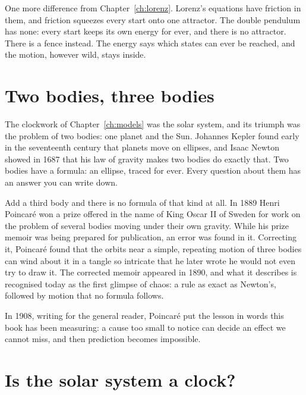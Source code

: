 \noindent
One more difference from Chapter~\ref{ch:lorenz}. Lorenz's equations have
friction in them, and friction squeezes every start onto one attractor. The
double pendulum has none: every start keeps its own energy for ever, and
there is no attractor. There is a fence instead. The energy says which states
can ever be reached, and the motion, however wild, stays inside.

\section{Two bodies, three bodies}
\label{sec:ch13-three}

\noindent
The clockwork of Chapter~\ref{ch:models} was the solar system, and its
triumph was the problem of two bodies: one planet and the Sun. Johannes
Kepler found early in the seventeenth century that planets move on ellipses,
and Isaac Newton showed in 1687 that his law of gravity makes two bodies do
exactly that. Two bodies have a formula: an ellipse, traced for ever. Every
question about them has an answer you can write down.

Add a third body and there is no formula of that kind at all. In 1889 Henri
Poincaré won a prize offered in the name of King Oscar II of Sweden for work
on the problem of several bodies moving under their own gravity. While his
prize memoir was being prepared for publication, an error was found in it.
Correcting it, Poincaré found that the orbits near a simple, repeating motion
of three bodies can wind about it in a tangle so intricate that he later
wrote he would not even try to draw it. The corrected memoir appeared in
1890, and what it describes is recognised today as the first glimpse of
chaos: a rule as exact as Newton's, followed by motion that no formula
follows.

In 1908, writing for the general reader, Poincaré put the lesson in words
this book has been measuring: a cause too small to notice can decide an effect
we cannot miss, and then prediction becomes impossible.


\section{Is the solar system a clock?}
\label{sec:ch13-solar}

